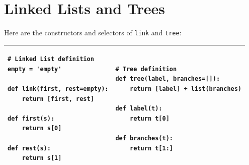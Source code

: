 \documentclass{exam}
\begin{document}
\clearpage 

\section{Linked Lists and Trees}
Here are the constructors and selectors of \texttt{link} and \texttt{tree}:
\begin{center}
    \begin{tabular}{|m{8cm}|m{8cm}|}
\hline
\begin{lstlisting}
# Linked List definition
empty = 'empty'

def link(first, rest=empty):
    return [first, rest]

def first(s):
    return s[0] 
    
def rest(s):
    return s[1]
    \end{lstlisting}
    
    
    
    & \begin{lstlisting}
# Tree definition
def tree(label, branches=[]):
    return [label] + list(branches)

def label(t):
    return t[0]

def branches(t): 
    return t[1:]
    \end{lstlisting} \\

\hline
\end{tabular}
\end{center}
\end{document}
